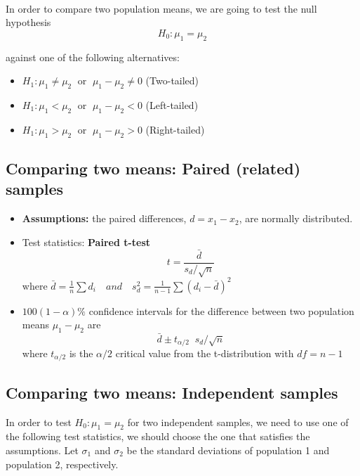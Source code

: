 \documentclass[
]{article}
\begin{document}
\(~\)

In order to compare two population means, we are going to test the null
hypothesis \[H_{0} :\mu _{1} =\mu _{2} \]

against one of the following alternatives:

\begin{itemize}
\item
  \(H_1:\mu_1\neq\mu_2\;\) or \(\;\mu_1-\mu_2\neq 0\) (Two-tailed)
\item
  \(H_1:\mu_1<\mu_2\;\) or \(\;\mu_1-\mu_2< 0\) (Left-tailed)
\item
  \(H_1:\mu_1>\mu_2\;\) or \(\;\mu_1-\mu_2> 0\) (Right-tailed)
\end{itemize}

\hypertarget{comparing-two-means-paired-related-samples}{%
\subsection{Comparing two means: Paired (related)
samples}\label{comparing-two-means-paired-related-samples}}

\begin{itemize}
\item
  \textbf{Assumptions:} the paired differences, \(d = x_1- x_2\), are
  normally distributed.
\item
  Test statistics: \textbf{Paired t-test}
  \[t=\frac{\bar{d}}{s_{d} /\sqrt{n} } \] where
  \(\bar{d}=\frac{1}{n}\sum d_{i} \quad and\quad s_d^2 =\frac{1}{n-1}\sum (d{}_{i} -\bar{d})^{2}\)
\item
  \(100(1- \alpha)\%\) confidence intervals for the difference between
  two population means \(\mu_{1} -\mu_{2}\) are
  \[\bar{d}\pm t_{\alpha/2} \;\; s_{d} /\sqrt{n} \] where
  \(t_{\alpha/2}\) is the \(\alpha/2\) critical value from the
  t-distribution with \(df = n-1\)
\end{itemize}

\hypertarget{comparing-two-means-independent-samples}{%
\subsection{Comparing two means: Independent
samples}\label{comparing-two-means-independent-samples}}

In order to test \(H_0:\mu_1=\mu_2\) for two independent samples, we
need to use one of the following test statistics, we should choose the
one that satisfies the assumptions. Let \(\sigma_1\) and \(\sigma_2\) be
the standard deviations of population 1 and population 2, respectively.
\end{document}

